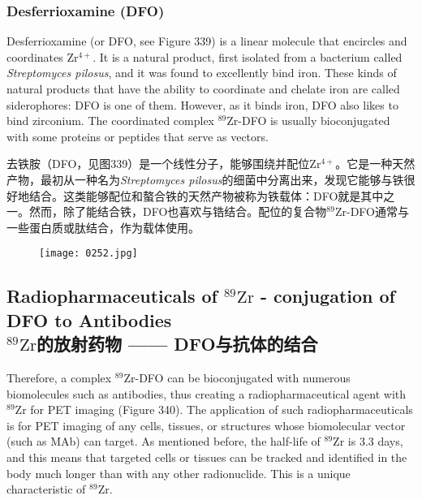 \documentclass[dvipsnames, svgnames,a4paper,11pt]{article}
\begin{document}
\subsubsection{Desferrioxamine (DFO)}  
Desferrioxamine (or DFO, see Figure 339) is a linear molecule that encircles and coordinates \(\mathrm{Zr^{4+}}\). It is a natural product, first isolated from a bacterium called \textit{Streptomyces pilosus}, and it was found to excellently bind iron. These kinds of natural products that have the ability to coordinate and chelate iron are called siderophores: DFO is one of them. However, as it binds iron, DFO also likes to bind zirconium. The coordinated complex \(\mathrm{^{89}Zr}\)-DFO is usually bioconjugated with some proteins or peptides that serve as vectors.

去铁胺（DFO，见图339）是一个线性分子，能够围绕并配位\(\mathrm{Zr^{4+}}\)。它是一种天然产物，最初从一种名为\textit{Streptomyces pilosus}的细菌中分离出来，发现它能够与铁很好地结合。这类能够配位和螯合铁的天然产物被称为铁载体：DFO就是其中之一。然而，除了能结合铁，DFO也喜欢与锆结合。配位的复合物\(\mathrm{^{89}Zr}\)-DFO通常与一些蛋白质或肽结合，作为载体使用。

\begin{figure}[h]
	\centering
    \texttt{[image: 0252.jpg]}  
     \label{fig339}
\end{figure}


\subsection{Radiopharmaceuticals of \(\mathrm{^{89}Zr}\) - conjugation of DFO to Antibodies\\ \(\mathrm{^{89}Zr}\)的放射药物 —— DFO与抗体的结合}  

Therefore, a complex \(\mathrm{^{89}Zr}\)-DFO can be bioconjugated with numerous biomolecules such as antibodies, thus creating a radiopharmaceutical agent with \(\mathrm{^{89}Zr}\) for PET imaging (Figure 340). The application of such radiopharmaceuticals is for PET imaging of any cells, tissues, or structures whose biomolecular vector (such as MAb) can target. As mentioned before, the half-life of \(\mathrm{^{89}Zr}\) is 3.3 days, and this means that targeted cells or tissues can be tracked and identified in the body much longer than with any other radionuclide. This is a unique characteristic of \(\mathrm{^{89}Zr}\).
\end{document}
